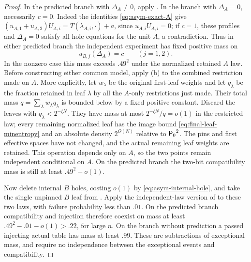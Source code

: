 \begin{proof}
In the predicted branch with \(\Delta_A\ne0\), apply
.  In the branch with
\(\Delta_A=0\), necessarily \(c=0\).  Indeed the identities
\eqref{eq:asym-exact-A} give
\((u_{A,1}+u_{A,2})U_{A,i}=T(\lambda_{A,i},\cdot)+a\),
since \(u_{A,i}U_{A,i}=0\); if \(c=1\), these profiles and
\(\Delta_A=0\) satisfy all hole equations for the unit \(A\),
a contradiction.  Thus in either predicted branch the independent
experiment has fixed positive mass on
\begin{equation}
\label{eq:asym-compatible}
 u_{B,j}(\Delta_A)=c\qquad(j=1,2).
\end{equation}
In the nonzero case this mass exceeds \(.49^2\) under the
normalized retained \(A\) law.  Before constructing either
common model, apply \textup{(b)} to the
combined restriction made on \(A\).  More explicitly, let
\(w_\lambda\) be the original first-leaf weights and let
\(q_\lambda\) be the fraction retained in leaf \(\lambda\)
by all the \(A\)-only restrictions just made.  Their total
mass \(q=\sum_\lambda w_\lambda q_\lambda\) is bounded below
by a fixed positive constant.  Discard the leaves with
\(q_\lambda<2^{-\zeta N}\).  They have mass at most
\(2^{-\zeta N}/q=o(1)\) in the restricted law; every remaining
normalized leaf has the image bound
\eqref{eq:final-leaf-minentropy} and an absolute density
\(2^{O(N)}\) relative to \({\mathsf P_0}^2\).  The pins and first
effective spaces have not changed, and the actual remaining
leaf weights are retained.  This operation depends only on
\(A\), so the two points remain independent conditional on
\(A\).  On the predicted branch the two-bit compatibility mass
is still at least \(.49^2-o(1)\).

Now delete internal \(B\) holes, costing \(o(1)\) by
\eqref{eq:asym-internal-hole}, and take the single unpinned
\(B\) leaf from .
Apply the independent-law version of  to
these two laws, with failure probability less than \(.01\).
On the predicted branch compatibility and injection therefore
coexist on mass at least \(.49^2-.01-o(1)>.22\), for large
\(n\).  On the branch without prediction a passed injecting
actual table has mass at least \(.99\).  These are subtractions
of exceptional mass, and require no independence between the
exceptional events and compatibility.


\end{proof}
